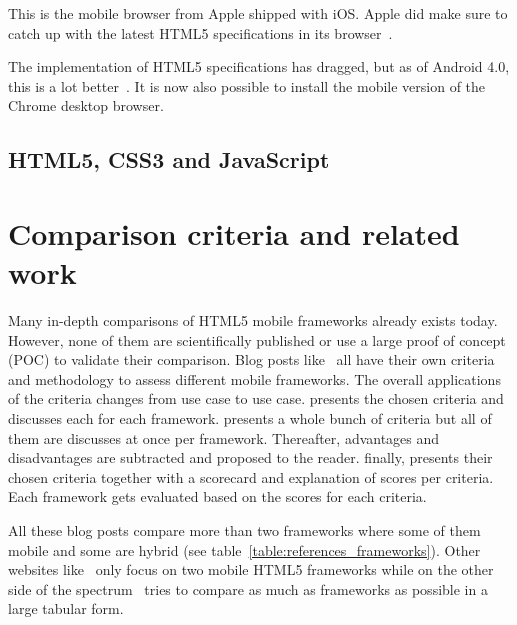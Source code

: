 \documentclass[a4paper]{artikel3}
\renewcommand{\paragraph}[1]{\vspace{2mm} \noindent {\bf #1}  }
\begin{document}
\paragraph{Mobile Safari}
This is the mobile browser from Apple shipped with iOS.
Apple did make sure to catch up with the latest HTML5 specifications in its browser~\cite{Hales2012}.

\paragraph{Android browser}
The implementation of HTML5 specifications has dragged, but as of Android 4.0, this is a lot better~\cite{Hales2012}.
It is now also possible to install the mobile version of the Chrome desktop browser.

\subsection{HTML5, CSS3 and JavaScript}

\section{Comparison criteria and related work}
\label{sec:comparisoncriteria}


Many in-depth comparisons of HTML5 mobile frameworks already exists today.  However, none of them are scientifically published or use a large proof of concept (POC) to validate their comparison.  Blog posts like~\cite{Sarrafi2012a,Ayuso2012,Rozynski2011} all have their own criteria and methodology to assess different mobile frameworks.  The overall applications of the criteria changes from use case to use case.  \cite{Rozynski2011} presents the chosen criteria and discusses each for each framework.  \cite{Ayuso2012} presents a whole bunch of criteria but all of them are discusses at once per framework.  Thereafter,  advantages and disadvantages are subtracted and proposed to the reader.  \cite{Sarrafi2012a} finally,  presents their chosen criteria together with a scorecard and explanation of scores per criteria.  Each framework gets evaluated based on the scores for each criteria.

All these blog posts compare more than two frameworks where some of them mobile and some are hybrid (see table~\ref{table:references_frameworks}).  Other websites like~\cite{Bristowe2012,Burris} only focus on two mobile HTML5 frameworks while on the other side of the spectrum~\cite{Falk2011} tries to compare as much as frameworks as possible in a large tabular form.
\end{document}
